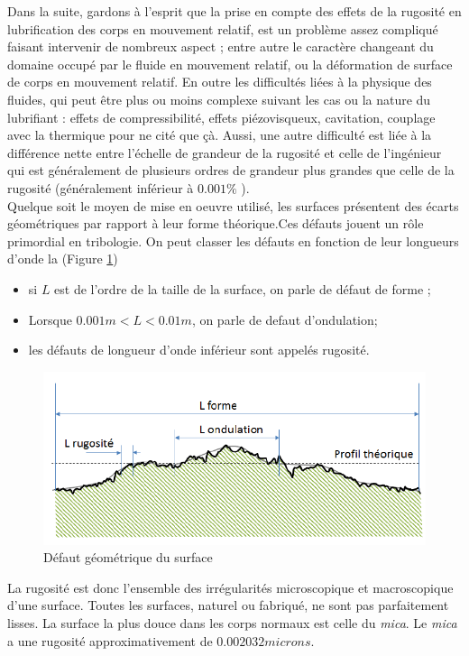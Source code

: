 Dans la suite, gardons à l'esprit que la prise en compte des effets de la rugosité en lubrification des corps en mouvement relatif, est un problème assez compliqué faisant intervenir de nombreux aspect ; entre autre le caractère changeant du domaine occupé par le fluide en mouvement relatif, ou la déformation de surface de corps en mouvement relatif. En outre les difficultés liées à la physique des fluides, qui peut être plus ou moins complexe suivant les cas ou la nature du lubrifiant : effets de compressibilité, effets piézovisqueux, cavitation, couplage avec la thermique pour ne cité que çà. Aussi, une autre difficulté est liée à la différence nette entre l'échelle de grandeur de la rugosité et celle de l'ingénieur qui est généralement de plusieurs ordres de grandeur plus grandes que celle de la rugosité (généralement inférieur à $0.001\%$ )\cite{initiation}.\\

Quelque soit le moyen de mise en oeuvre utilisé, les surfaces présentent des écarts géométriques par rapport à leur forme théorique.Ces défauts jouent un rôle primordial en tribologie. On peut classer les défauts en fonction de leur longueurs d'onde la (Figure \ref{fig:ondulation})
\begin{itemize}
	\item si $L$ est de l’ordre de la taille de la surface, on parle de défaut de forme ;
	\item Lorsque $0.001m < L < 0.01m$, on parle de defaut d'ondulation;
	\item les défauts de longueur d’onde inférieur sont appelés rugosité.
\end{itemize}
\begin{figure}
	\centering
	\includegraphics[width=0.7\linewidth]{Img/ondulation}
	\caption[Défaut géométrique du surfacee]{Défaut géométrique du surface}
	\label{fig:ondulation}
\end{figure}
La rugosité est donc l'ensemble des irrégularités microscopique et macroscopique d'une surface.
Toutes les surfaces, naturel ou fabriqué, ne sont pas parfaitement lisses. La surface la plus
douce dans les corps normaux est celle du \emph{mica}. Le \emph{mica} a une rugosité approximativement de $0.002032 microns$.\cite{ayad1}

